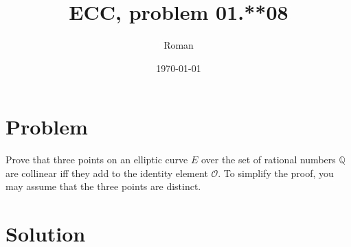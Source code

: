 \documentclass[12pt]{article}
\title{ECC, problem 01.**08}
\author{Roman}
\date{\today}
\begin{document}
\maketitle

\section*{Problem}
Prove that three points on an elliptic curve ${E}$ over the set of rational numbers $\mathbb{Q}$ are collinear
iff they add to the identity element $\mathcal{O}$. To simplify the proof, you may assume that the three points
are distinct.

\pagebreak

\section*{Solution}
\end{document}
